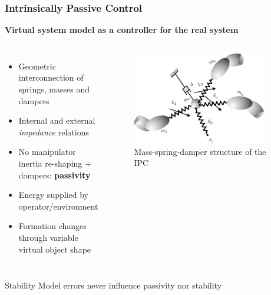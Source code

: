 \documentclass[student]{ITRslides}
\begin{document}
\begin{frame}
	\frametitle{Intrinsically Passive Control}
	\textbf{Virtual system model as a controller for the real system}
\begin{columns}[t]
			
	
		\begin{itemize}
			\item Geometric interconnection of springs, masses and dampers
			\item Internal and external \emph{impedance} relations
			\item No manipulator inertia re-shaping + dampers: \textbf{passivity}
			\item Energy supplied by operator/environment
			\item Formation changes through variable virtual object shape
		\end{itemize}

		
             \begin{figure}[htb]
			\centering
			\includegraphics[width=0.9\textwidth]{IPCsprings.png}
			\caption{Mass-spring-damper structure of the IPC \cite{Stramigioli_01}}
			\end{figure}
		
			
		\end{columns}
					\begin{block}{Stability}
Model errors never influence passivity nor stability \cite{Stramigioli_01}
	\end{block}
\end{frame}
\end{document}
